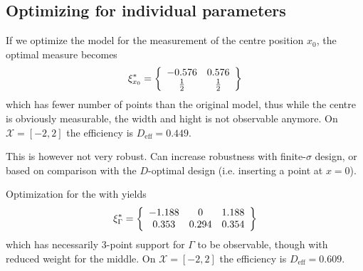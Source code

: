 \documentclass[12pt]{iopart}
\begin{document}
\subsection{Optimizing for individual parameters}
\label{seq:exopts}

If we optimize the model  for the measurement of the centre position $x_0$, the optimal measure becomes
\begin{equation}
\xi^*_{x_0} = \left\{
  \begin{array}{c c}
    -0.576 & 0.576 \\
    \frac{1}{2} & \frac{1}{2}\\
  \end{array} \right \}
\end{equation}
which has fewer number of points than the original model, thus while the centre is obviously measurable, the width and hight is not observable anymore.  On $\mathcal{X} = [-2,2]$ the efficiency is $D_\mathrm{eff} = 0.449$.

This is however not very robust. Can increase robustness with finite-$\sigma$ design, or based on comparison with the $D$-optimal design (i.e. inserting a point at $x=0$).


Optimization for the with yields
\begin{equation}
\xi^*_{\Gamma} = \left\{
  \begin{array}{c c c}
    -1.188 & 0 &  1.188 \\
    0.353 & 0.294 & 0.354\\
  \end{array} \right \}
\end{equation}
which has necessarily 3-point support for $\Gamma$ to be observable, though with reduced weight for the middle. On $\mathcal{X} = [-2,2]$ the efficiency is $D_\mathrm{eff} = 0.609$.
\end{document}
